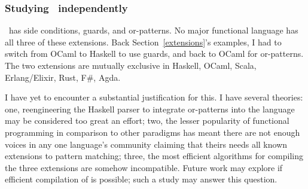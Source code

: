 \documentclass[manuscript,screen,review, 12pt, nonacm]{acmart}
\begin{document}

            
            
            



        \subsubsection{Studying \PPlus\ independently}
        \label{pplusindependently}
        \PPlus\ has side conditions, guards, and or-patterns. No major
        functional language has all three of these extensions. Back
        Section~\ref{extensions}'s examples, I had to switch from OCaml to
        Haskell to use guards, and back to OCaml for or-patterns. The two
        extensions are mutually exclusive in Haskell, OCaml, Scala,
        Erlang/Elixir, Rust, F\#, Agda.~\citep{haskell, ocaml, scala, erlang,
        elixir, rust, fsharp, agda}

        I have yet to encounter a substantial justification for this. I have
        several theories: one, reengineering the Haskell parser to integrate
        or-patterns into the language may be considered too great an effort;
        two, the lesser popularity of functional programming in comparison to
        other paradigms has meant there are not enough voices in any one
        language's community claiming that theirs needs all known extensions to
        pattern matching; three, the most efficient algorithms for compiling the
        three extensions are somehow incompatible. Future work may explore if
        efficient compilation of \PPlus is possible; such a study may answer this
        question. 
\end{document}
